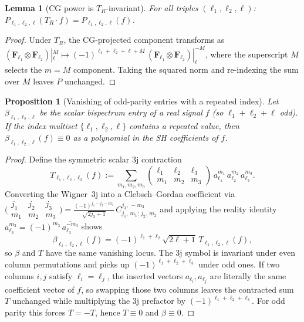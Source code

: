 \documentclass{article}
\newtheorem{proposition}[theorem]{Proposition}
\newtheorem{lemma}[theorem]{Lemma}
\theoremstyle{definition}
\theoremstyle{remark}
\newcommand{\CG}[6]{C^{#5,\,#6}_{#1,\,#2;\,#3,\,#4}}
\newcommand{\conj}[1]{\overline{#1}}
\theoremstyle{definition}
\begin{document}
\begin{lemma}[CG power is $T_R$-invariant]\label{lem:app-P-invariant}
For all triples $(\ell_1,\ell_2,\ell)$:
$P_{\ell_1,\ell_2,\ell}(T_R \cdot f) = P_{\ell_1,\ell_2,\ell}(f)$.
\end{lemma}
\begin{proof}
Under $T_R$, the CG-projected component transforms as
$(\mathbf{F}_{\ell_1} \otimes \mathbf{F}_{\ell_2})|_\ell^M
  \mapsto (-1)^{\ell_1+\ell_2+\ell+M}\,
  (\mathbf{F}_{\ell_1} \otimes \mathbf{F}_{\ell_2})|_\ell^{-M}$,
where the superscript $M$ selects the $m=M$ component.
Taking the squared norm and re-indexing the sum over $M$
leaves $P$ unchanged.
\end{proof}

\begin{proposition}[Vanishing of odd-parity entries with a repeated index]
\label{prop:app-odd-vanishing}
Let $\beta_{\ell_1,\ell_2,\ell}$ be the scalar bispectrum entry of a
real signal $f$ (so $\ell_1+\ell_2+\ell$ odd). If the index multiset
$\{\ell_1,\ell_2,\ell\}$ contains a repeated value, then
$\beta_{\ell_1,\ell_2,\ell}(f)\equiv 0$ as a polynomial in the SH
coefficients of $f$.
\end{proposition}

\begin{proof}
Define the symmetric scalar 3j contraction
\[
  T_{\ell_1,\ell_2,\ell_3}(f) :=
  \sum_{m_1,m_2,m_3}
  \begin{pmatrix} \ell_1 & \ell_2 & \ell_3 \\
                  m_1 & m_2 & m_3 \end{pmatrix}\,
  a_{\ell_1}^{m_1}\, a_{\ell_2}^{m_2}\, a_{\ell_3}^{m_3} .
\]
Converting the Wigner~3j into a Clebsch--Gordan coefficient via
$\bigl(\begin{smallmatrix} j_1 & j_2 & j_3 \\
       m_1 & m_2 & m_3\end{smallmatrix}\bigr)
= \frac{(-1)^{j_1-j_2-m_3}}{\sqrt{2j_3+1}}\,
  \CG{j_1}{m_1}{j_2}{m_2}{j_3}{-m_3}$ and applying the reality identity
$a_{\ell_3}^{m_3} = (-1)^{m_3}\,\conj{a_{\ell_3}^{-m_3}}$ shows
\[
  \beta_{\ell_1,\ell_2,\ell}(f)
  = (-1)^{\ell_1+\ell_2}\sqrt{2\ell+1}\,
    T_{\ell_1,\ell_2,\ell}(f),
\]
so $\beta$ and $T$ have the same vanishing locus. The 3j symbol is
invariant under even column permutations and picks up
$(-1)^{\ell_1+\ell_2+\ell_3}$ under odd ones. If two columns $i,j$
satisfy $\ell_i=\ell_j$, the inserted vectors $a_{\ell_i},a_{\ell_j}$
are literally the same coefficient vector of $f$, so swapping those
two columns leaves the contracted sum $T$ unchanged while multiplying
the 3j prefactor by $(-1)^{\ell_1+\ell_2+\ell_3}$. For odd parity this
forces $T=-T$, hence $T\equiv 0$ and $\beta\equiv 0$.
\end{proof}
\end{document}
